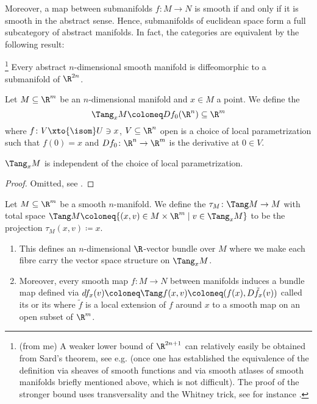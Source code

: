 Moreover, a map between submanifolds $f\colon M \to N$ is smooth if and only if it is smooth in the abstract sense. 
Hence, submanifolds of euclidean space form a full subcategory of abstract manifolds.
In fact, the categories are equivalent by the following result:
\begin{theorem}\footnote{(from me) A weaker lower bound of $\R^{2n + 1}$ can relatively easily be obtained from Sard's theorem, see e.g. \cite[Theorem 6.15]{lee_introduction_2012} (once one has established the equivalence of the definition via sheaves of smooth functions and via smooth atlases of smooth manifolds briefly mentioned above, which is not difficult). The proof of the stronger bound uses transversality and the Whitney trick, see for instance \cite{whitney_self-intersections_1944}.}
	Every abstract $n$-dimensional smooth manifold is diffeomorphic to a submanifold of $\R^{2n}$.
\end{theorem}
Let $M \subseteq \R^m$ be an $n$-dimensional manifold and $x \in M$ a point.
We define the 
\begin{equation*}
	\Tang_x M \coloneq D f_0(\R^n) \subseteq \R^m
\end{equation*}
where $f\colon V \xto{\isom} U \ni x$, $V \subseteq \R^n$ open is a choice of local parametrization such that $f(0) = x$ and $D f_0\colon \R^n \to \R^m$ is the derivative at $0 \in V$.
\begin{lemma}
	$\Tang_x M$ is independent of the choice of local parametrization.
\end{lemma}
\begin{proof}
	Omitted, see \cite[Section 1]{milnor_characteristic_1974}.
\end{proof}
\begin{definition}
	Let $M \subseteq \R^m$ be a smooth $n$-manifold.
	We define the  $\tau_M\colon \Tang M \to M$ with total space $\Tang M \coloneq \{(x, v) \in M \times \R^m \mid v \in \Tang_x M\}$ to be the projection $\tau_M(x, v) \coloneq x$.
\end{definition}
\begin{lemma}
	\leavevmode
	\begin{enumerate}
		\item This defines an $n$-dimensional $\R$-vector bundle over $M$ where we make each fibre carry the vector space structure on $\Tang_x M$.
		\item Moreover, every smooth map $f\colon M \to N$ between manifolds induces a bundle map defined via $d f_x(v) \coloneq \Tang f(x, v) \coloneq (f(x), D \tilde{f}_x(v))$ called its  or its  where $\tilde{f}$ is a local extension of $f$ around $x$ to a smooth map on an open subset of $\R^m$.
	\end{enumerate}
\end{lemma}
